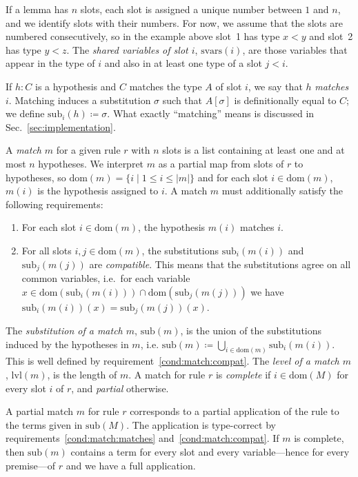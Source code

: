 \documentclass[runningheads,leqno]{llncs}
\newcommand{\vars}{\ensuremath{\mathrm{svars}}}
\newcommand{\dom}{\ensuremath{\mathrm{dom}}}
\newcommand{\sub}{\ensuremath{\mathrm{sub}}}
\newcommand{\lvl}{\ensuremath{\mathrm{lvl}}}
\begin{document}
If a lemma has $n$ slots, each slot is assigned a unique number between $1$ and $n$, and we identify slots with their numbers.
For now, we assume that the slots are numbered consecutively, so in the example above slot~1 has type $x < y$ and slot~2 has type $y < z$.
The \emph{shared variables of slot $i$}, $\vars(i)$, are those variables that appear in the type of $i$ and also in at least one type of a slot $j < i$.

If $h : C$ is a hypothesis and $C$ matches the type $A$ of slot $i$, we say that $h$ \emph{matches} $i$.
Matching induces a substitution $σ$ such that $A[σ]$ is definitionally equal to $C$; we define $\sub_{i}(h) ≔ σ$.
What exactly \enquote{matching} means is discussed in Sec.~\ref{sec:implementation}.

A \textit{match} $m$ for a given rule $r$ with $n$ slots is a list containing at least one and at most $n$ hypotheses.
We interpret $m$ as a partial map from slots of $r$ to hypotheses, so $\dom(m) = \{i \mid 1 ≤ i ≤ |m| \}$ and for each slot $i ∈ \dom(m)$, $m(i)$ is the hypothesis assigned to $i$.
A match $m$ must additionally satisfy the following requirements:
\begin{enumerate}
  \item\label{cond:match:matches} For each slot $i ∈ \dom(m)$, the hypothesis $m(i)$ matches $i$.

  \item\label{cond:match:compat} For all slots $i,j ∈ \dom(m)$, the substitutions $\sub_{i}(m(i))$ and $\sub_{j}(m(j))$ are \emph{compatible}.
        This means that the substitutions agree on all common variables, i.e.\ for each variable $x ∈ \dom(\sub_{i}(m(i))) ∩ \dom(\sub_{j}(m(j)))$ we have $\sub_{i}(m(i))(x) = \sub_{j}(m(j))(x)$.
\end{enumerate}
The \emph{substitution of a match $m$}, $\sub(m)$, is the union of the substitutions induced by the hypotheses in $m$, i.e. $\sub(m) ≔ ⋃_{i ∈ \dom(m)}\sub_{i}(m(i))$.
This is well defined by requirement~\ref{cond:match:compat}.
The \textit{level of a match $m$}, $\lvl(m)$, is the length of $m$.
A match for rule $r$ is \textit{complete} if $i ∈ \dom(M)$ for every slot $i$ of $r$, and \emph{partial} otherwise.

A partial match $m$ for rule $r$ corresponds to a partial application of the rule to the terms given in $\sub(M)$.
The application is type-correct by requirements~\ref{cond:match:matches} and~\ref{cond:match:compat}.
If $m$ is complete, then $\sub(m)$ contains a term for every slot and every variable---hence for every premise---of $r$ and we have a full application.
\end{document}
